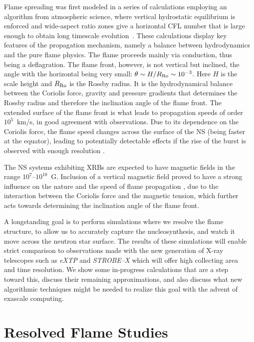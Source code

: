 \documentclass[a4paper]{jpconf}
\begin{document}
Flame spreading was first modeled in a series of calculations
employing an algorithm from atmospheric science, where vertical
hydrostatic equilibrium is enforced and wide-aspect ratio zones give a
horizontal CFL number that is large enough to obtain long timescale
evolution~\cite{cavecchi:2012}.
These calculations display key features of the propagation
mechanism, namely a balance between hydrodynamics and the pure
flame physics. The flame proceeds mainly via conduction, thus being a
deflagration. The flame front, however, is not vertical but inclined,
the angle with the horizontal being very small: $\theta \sim
H/R_{\rm{Ro}} \sim 10^{-3}$. Here $H$ is the scale height and
$R_{\rm{Ro}}$ is the Rossby radius. It is the hydrodynamical balance
between the Coriolis force, gravity and pressure gradients that
determines the Rossby radius and therefore the inclination angle of the
flame front. The extended surface of the flame front is what leads to
propagation speeds of order $10^5 $~km/s, in good agreement with
observations. Due to its dependence on the Coriolis force, the flame
speed changes across the surface of the NS (being faster at the
equator), leading to potentially detectable effects if the rise of the
burst is observed with enough resolution
\cite{art-2015-cavecchi-etal}.

The NS systems exhibiting XRBs are
expected to have magnetic fields in the range $10^7$--$10^{10}$~G.
Inclusion of a vertical magnetic field proved to have a strong
influence on the nature and the speed of flame propagation
\cite{art-2016-cavecchi-etal}, due to the interaction between the
Coriolis force and the magnetic tension, which further acts towards
determining the inclination angle of the flame front.

A longstanding goal is to perform simulations where we resolve the
flame structure, to allow us to accurately capture the
nucleosynthesis, and watch it move across the neutron star surface.
The results of these simulations will enable strict comparison to
observations made with the new generation of X-ray telescopes such as
\textit{eXTP} and \textit{STROBE--X}
\cite{art-2017-wilhod-etal,art-2016-zhang-etal} which will offer
high collecting area and time resolution.
We show some in-progress calculations that are a step toward this, discuss
their remaining approximations, and also discuss what new algorithmic
techniques might be needed to realize this goal with the advent of
exascale computing.



\section{Resolved Flame Studies}
\end{document}
